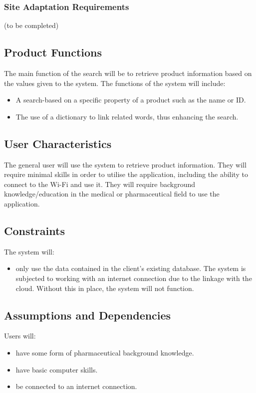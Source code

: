 \documentclass[a4paper,10pt]{article}
\begin{document}
           \subsubsection{Site Adaptation Requirements}
        (to be completed)

		\subsection{Product Functions} {The main function of the search will be to retrieve product information based on the values given to the system. The functions of the system will include:  }
	\begin{itemize}
  		\item A search-based on a specific property of a product such as the name or ID.
		\item The use of a dictionary to link related words, thus enhancing the search.
	\end{itemize}
	
    	\subsection{User Characteristics}  

{The general user will use the system to retrieve product information. They will require minimal skills in order to utilise the application, including the ability to connect to the Wi-Fi and use it. They will require background knowledge/education in the medical or pharmaceutical field to use the application.\\}

    	\subsection{Constraints}
	The system will:
	\begin{itemize}
		\item only use the data contained in the client's existing database.
	The system is subjected to working with an internet connection due to the linkage with the cloud. Without this in place, the system will not function.	
		
	\end{itemize}
	
    	\subsection{Assumptions and Dependencies}
	Users will:	
	\begin{itemize}
		\item have some form of pharmaceutical background knowledge.
		\item have basic computer skills.
		\item be connected to an internet connection.
	\end{itemize}
\end{document}
